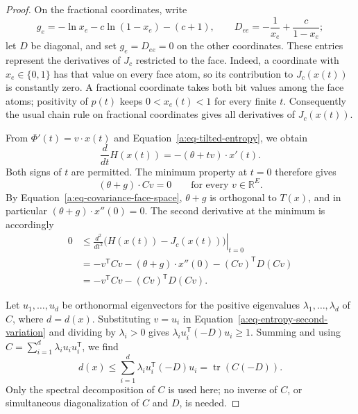 \begin{proof}
On the fractional coordinates, write
\[
  g_e=-\ln x_e-c\ln(1-x_e)-(c+1),
  \qquad
  D_{ee}=-\frac1{x_e}+\frac c{1-x_e};
\]
let \(D\) be diagonal, and set \(g_e=D_{ee}=0\) on the other
coordinates.  These entries represent the derivatives of \(J_c\)
restricted to the face.
Indeed, a coordinate with \(x_e\in\{0,1\}\) has that value on every
face atom, so its contribution to \(J_c(x(t))\) is constantly zero.
A fractional coordinate takes both bit values among the face
atoms; positivity of \(p(t)\) keeps \(0<x_e(t)<1\) for every finite
\(t\).  Consequently the usual chain rule on fractional coordinates
gives all derivatives of \(J_c(x(t))\).

From \(\Phi'(t)=v\cdot x(t)\) and
Equation~\eqref{a:eq-tilted-entropy}, we obtain
\[
  \frac{d}{dt} H(x(t))
  =-(\theta+tv)\cdot x'(t).
\]
Both signs of \(t\) are permitted.  The minimum property at \(t=0\)
therefore gives
\[
  (\theta+g)\cdot Cv=0
  \qquad\text{for every }v\in\mathbb R^E.
\]
By Equation~\eqref{a:eq-covariance-face-space}, \(\theta+g\) is
orthogonal to \(T(x)\), and in particular
\((\theta+g)\cdot x''(0)=0\).
The second derivative at the minimum is accordingly
\begin{equation}
\begin{aligned}
  0
  &\le
    \left.\frac{d^2}{dt^2}
      \bigl( H(x(t))-J_c(x(t))\bigr)\right|_{t=0}\\
  &=-v^{\mathsf T}Cv-(\theta+g)\cdot x''(0)
                     -(Cv)^{\mathsf T}D(Cv)\\
  &=-v^{\mathsf T}Cv-(Cv)^{\mathsf T}D(Cv).
\end{aligned}
\label{a:eq-entropy-second-variation}
\end{equation}

Let \(u_1,\ldots,u_d\) be orthonormal eigenvectors for the positive
eigenvalues \(\lambda_1,\ldots,\lambda_d\) of \(C\), where
\(d=d(x)\).
Substituting \(v=u_i\) in
Equation~\eqref{a:eq-entropy-second-variation} and dividing by
\(\lambda_i>0\) gives
\(\lambda_i u_i^{\mathsf T}(-D)u_i\ge1\).
Summing and using
\(C=\sum_{i=1}^d\lambda_i u_i u_i^{\mathsf T}\), we find
\begin{equation}
  d(x)\le
  \sum_{i=1}^d\lambda_i u_i^{\mathsf T}(-D)u_i
  =\operatorname{tr}(C(-D)).
  \label{a:eq-entropy-trace-lower}
\end{equation}
Only the spectral decomposition of \(C\) is used here; no inverse
of \(C\), or simultaneous diagonalization of \(C\) and \(D\),
is needed.


\end{proof}
